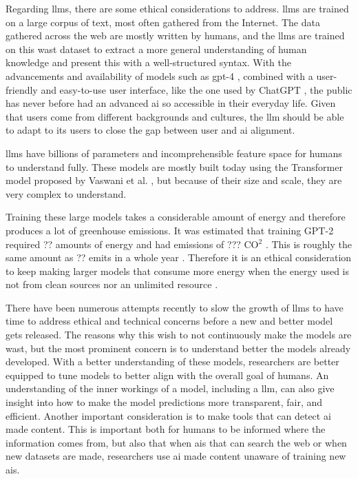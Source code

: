 Regarding \glspl{llm}, there are some ethical considerations to address. \glspl{llm} are trained on a large corpus of text, most often gathered from the Internet. The data gathered across the web are mostly written by humans, and the \glspl{llm} are trained on this wast dataset to extract a more general understanding of human knowledge and present this with a well-structured syntax. With the advancements and availability of models such as \gls{gpt}-4 \cite{openaiGPT4TechnicalReport2023}, combined with a user-friendly and easy-to-use user interface, like the one used by ChatGPT \cite{ChatGPT}, the public has never before had an advanced \gls{ai} so accessible in their everyday life. Given that users come from different backgrounds and cultures, the \gls{llm} should be able to adapt to its users to close the gap between user and \gls{ai} alignment. 

\glspl{llm} have billions of parameters and incomprehensible feature space for humans to understand fully. These models are mostly built today using the Transformer model proposed by Vaswani et al. \cite{vaswaniAttentionAllYou2017}, but because of their size and scale, they are very complex to understand. 



Training these large models takes a considerable amount of energy and therefore produces a lot of greenhouse emissions. It was estimated that training GPT-2 required ?? amounts of energy and had emissions of ??? CO$^2$ \cite{}. This is roughly the same amount as ?? emits in a whole year \cite{}. Therefore it is an ethical consideration to keep making larger models that consume more energy when the energy used is not from clean sources nor an unlimited resource \cite{}.


There have been numerous attempts recently to slow the growth of \glspl{llm} to have time to address ethical and technical concerns before a new and better model gets released. The reasons why this wish to not continuously make the models are wast, but the most prominent concern is to understand better the models already developed. With a better understanding of these models, researchers are better equipped to tune models to better align with the overall goal of humans. An understanding of the inner workings of a model, including a \gls{llm}, can also give insight into how to make the model predictions more transparent, fair, and efficient. Another important consideration is to make tools that can detect \gls{ai} made content. This is important both for humans to be informed where the information comes from, but also that when \glspl{ai} that can search the web or when new datasets are made, researchers use \gls{ai} made content unaware of training new \glspl{ai}.  

